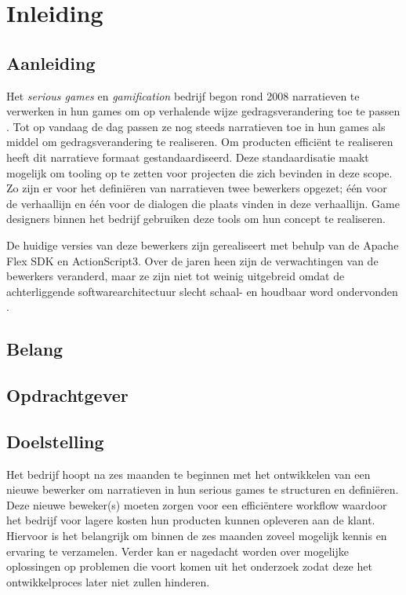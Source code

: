 \chapter{Inleiding}

\section{Aanleiding}
Het \emph{serious games} en \emph{gamification} bedrijf \organisation{} begon rond 2008 narratieven te verwerken in hun games om op
verhalende wijze gedragsverandering toe te passen \cite{interviewivo}. Tot op vandaag de dag passen ze nog steeds narratieven toe in hun games als middel om gedragsverandering te realiseren.
Om producten efficiënt te realiseren heeft \organisation{} dit narratieve formaat gestandaardiseerd. Deze standaardisatie maakt mogelijk om tooling op te zetten voor projecten die zich bevinden in deze scope. Zo zijn er voor het definiëren van narratieven twee bewerkers opgezet; één voor de verhaallijn en één voor de dialogen die plaats vinden in deze verhaallijn. Game designers binnen het bedrijf gebruiken deze tools om hun concept te realiseren.

De huidige versies van deze bewerkers zijn gerealiseert met behulp van de Apache Flex SDK en ActionScript3. Over de jaren heen zijn de verwachtingen van de bewerkers veranderd, maar ze zijn niet tot weinig uitgebreid omdat de achterliggende softwarearchitectuur slecht schaal- en houdbaar word ondervonden \cite{interviewivo}.


\section{Belang}


\section{Opdrachtgever}


\section{Doelstelling}
Het bedrijf hoopt na zes maanden te beginnen met het ontwikkelen van een nieuwe bewerker om narratieven in hun serious games te structuren en definiëren.
Deze nieuwe beweker(s) moeten zorgen voor een efficiëntere workflow waardoor het bedrijf voor lagere kosten hun producten kunnen opleveren aan de klant.
Hiervoor is het belangrijk om binnen de zes maanden zoveel mogelijk kennis en ervaring te verzamelen. %
Verder kan er nagedacht worden over mogelijke oplossingen op problemen die voort komen uit het onderzoek zodat deze het ontwikkelproces later niet zullen hinderen.

